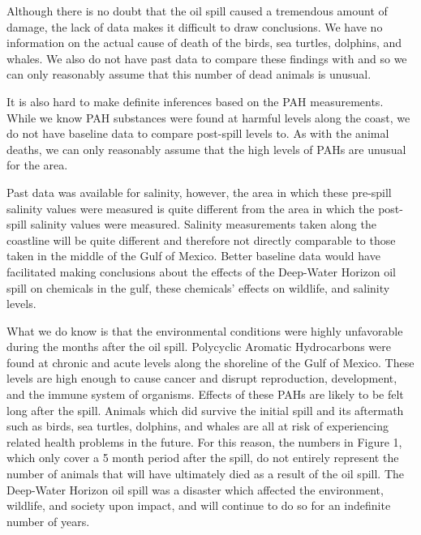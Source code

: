 \documentclass[authoryear,12pt]{elsarticle}
\begin{document}
Although there is no doubt that the oil spill caused a tremendous amount of damage, the lack of data makes it difficult to draw conclusions. We have no information on the actual cause of death of the birds, sea turtles, dolphins, and whales.  We also do not have past data to compare these findings with and so we can only reasonably assume that this number of dead animals is unusual. 

It is also hard to make definite inferences based on the PAH measurements.  While we know PAH substances were found at harmful levels along the coast, we do not have baseline data to compare post-spill levels to. As with the animal deaths, we can only reasonably assume that the high levels of PAHs are unusual for the area. 

Past data was available for salinity, however, the area in which these pre-spill salinity values were measured is quite different from the area in which the post-spill salinity values were measured.  Salinity measurements taken along the coastline will be quite different and therefore not directly comparable to those taken in the middle of the Gulf of Mexico. Better baseline data would have facilitated making conclusions about the effects of the Deep-Water Horizon oil spill on chemicals in the gulf, these chemicals' effects on wildlife, and salinity levels.

 What we do know is that the environmental conditions were highly unfavorable during the months after the oil spill. Polycyclic Aromatic Hydrocarbons were found at chronic and acute levels along the shoreline of the Gulf of Mexico. These levels are high enough to cause cancer and disrupt reproduction, development, and the immune system of organisms. Effects of these PAHs are likely to be felt long after the spill. Animals which did survive the initial spill and its aftermath such as birds, sea turtles, dolphins, and whales are all at risk of experiencing related health problems in the future. For this reason, the numbers in Figure 1, which only cover a 5 month period after the spill, do not entirely represent the number of animals that will have ultimately died as a result of the oil spill. The Deep-Water Horizon oil spill was a disaster which affected the environment, wildlife, and society upon impact, and will continue to do so for an indefinite number of years.
\end{document}
